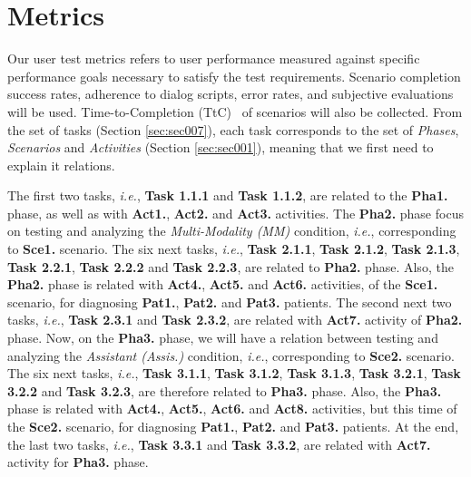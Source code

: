 
\section{Metrics}
\label{sec:sec008}

Our user test metrics refers to user performance measured against specific performance goals necessary to satisfy the test requirements. Scenario completion success rates, adherence to dialog scripts, error rates, and subjective evaluations will be used. Time-to-Completion (TtC)~\cite{ioannidis1998effect} of scenarios will also be collected. From the set of tasks (Section \ref{sec:sec007}), each task corresponds to the set of {\it Phases}, {\it Scenarios} and {\it Activities} (Section \ref{sec:sec001}), meaning that we first need to explain it relations.

The first two tasks, {\it i.e.}, {\bf Task 1.1.1} and {\bf Task 1.1.2}, are related to the {\bf Pha1.} phase, as well as with {\bf Act1.}, {\bf Act2.} and {\bf Act3.} activities. The {\bf Pha2.} phase focus on testing and analyzing the {\it Multi-Modality (MM)} condition, {\it i.e.}, corresponding to {\bf Sce1.} scenario. The six next tasks, {\it i.e.}, {\bf Task 2.1.1}, {\bf Task 2.1.2}, {\bf Task 2.1.3}, {\bf Task 2.2.1}, {\bf Task 2.2.2} and {\bf Task 2.2.3}, are related to {\bf Pha2.} phase. Also, the {\bf Pha2.} phase is related with {\bf Act4.}, {\bf Act5.} and {\bf Act6.} activities, of the {\bf Sce1.} scenario, for diagnosing {\bf Pat1.}, {\bf Pat2.} and {\bf Pat3.} patients. The second next two tasks, {\it i.e.}, {\bf Task 2.3.1} and {\bf Task 2.3.2}, are related with {\bf Act7.} activity of {\bf Pha2.} phase. Now, on the {\bf Pha3.} phase, we will have a relation between testing and analyzing the {\it Assistant (Assis.)} condition, {\it i.e.}, corresponding to {\bf Sce2.} scenario. The six next tasks, {\it i.e.}, {\bf Task 3.1.1}, {\bf Task 3.1.2}, {\bf Task 3.1.3}, {\bf Task 3.2.1}, {\bf Task 3.2.2} and {\bf Task 3.2.3}, are therefore related to {\bf Pha3.} phase. Also, the {\bf Pha3.} phase is related with {\bf Act4.}, {\bf Act5.}, {\bf Act6.} and {\bf Act8.} activities, but this time of the {\bf Sce2.} scenario, for diagnosing {\bf Pat1.}, {\bf Pat2.} and {\bf Pat3.} patients. At the end, the last two tasks, {\it i.e.}, {\bf Task 3.3.1} and {\bf Task 3.3.2}, are related with {\bf Act7.} activity for {\bf Pha3.} phase.

